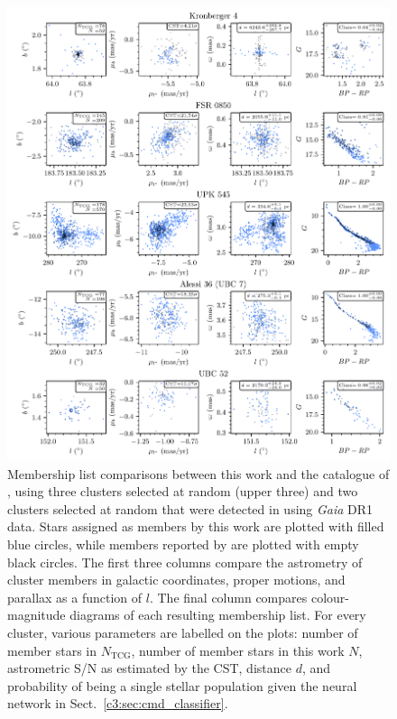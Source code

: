 
\begin{figure}[p]
   \centering
   \includegraphics[width=\textwidth]{fig/c3/fig_results_membership_comparison.pdf}
   \caption[Membership list comparisons between this work and the catalogue of \cite{cantat-gaudin_clusters_2020}]{Membership list comparisons between this work and the catalogue of \cite{cantat-gaudin_clusters_2020}, using three clusters selected at random (upper three) and two clusters selected at random that were detected in \cite{castro-ginard_new_2018} using \emph{Gaia} DR1 data. Stars assigned as members by this work are plotted with filled blue circles, while members reported by \cite{cantat-gaudin_clusters_2020} are plotted with empty black circles. The first three columns compare the astrometry of cluster members in galactic coordinates, proper motions, and parallax as a function of $l$. The final column compares colour-magnitude diagrams of each resulting membership list. For every cluster, various parameters are labelled on the plots: number of member stars in \cite{cantat-gaudin_clusters_2020} $N_{\text{TCG}}$, number of member stars in this work $N$, astrometric S/N as estimated by the CST, distance $d$, and probability of being a single stellar population given the neural network in Sect.~\ref{c3:sec:cmd_classifier}.
   }%
   \label{c3:fig:membership_comparison}
\end{figure}

